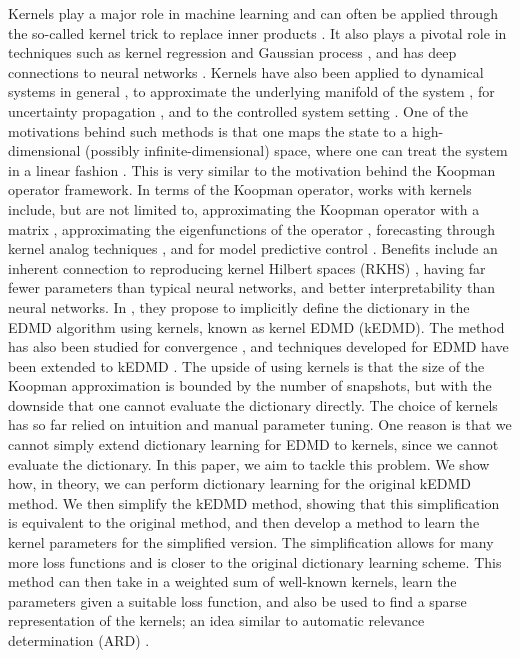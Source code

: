 \documentclass{article}
\begin{document}
Kernels play a major role in machine learning and can often be applied through the so-called kernel trick to replace inner products \citep{hastie-2009, owhadi-2019,hamzi-2024}. It also plays a pivotal role in techniques such as kernel regression and Gaussian process \citep{rasmussen-2005,yang-2021c, lee-2025b}, and has deep connections to neural networks \citep{jacot-2018,lee-2018, avidan-2024}. Kernels have also been applied to dynamical systems in general \citep{bouvrie-2017, hamzi-2021}, to approximate the underlying manifold of the system 
\citep{haasdonk-2018,bitteracher-2019, haasdonk-2021}, for uncertainty propagation \citep{hou-2024}, and to the controlled system setting \citep{hamzi-2019}. One of the motivations behind such methods is that one maps the state to a high-dimensional (possibly infinite-dimensional) space, where one can treat the system in a linear fashion \citep{bouvrie-2010, bouvrie-2012}. This is very similar to the motivation behind the Koopman operator framework. In terms of the Koopman operator, works with kernels include, but are not limited to, approximating the Koopman operator with a matrix \citep{williams-2015b, klus-2020}, approximating the eigenfunctions of the operator \citep{lee-2025}, forecasting through kernel analog techniques \citep{alexander-2020}, and for model predictive control \citep{bold-2025}. Benefits include an inherent connection to reproducing kernel Hilbert spaces (RKHS) \citep{boulle-2025}, having far fewer parameters than typical neural networks, and better interpretability than neural networks. In \citet{williams-2015b}, they propose to implicitly define the dictionary in the EDMD algorithm using kernels, known as kernel EDMD (kEDMD). The method has also been studied for convergence \citep{philipp-2025}, and techniques developed for EDMD have been extended to kEDMD \citep{colbrook-2021}. The upside of using kernels is that the size of the Koopman approximation is bounded by the number of snapshots, but with the downside that one cannot evaluate the dictionary directly. The choice of kernels has so far relied on intuition and manual parameter tuning. One reason is that we cannot simply extend dictionary learning for EDMD to kernels, since we cannot evaluate the dictionary. In this paper, we aim to tackle this problem. We show how, in theory, we can perform dictionary learning for the original kEDMD method. We then simplify the kEDMD method, showing that this simplification is equivalent to the original method, and then develop a method to learn the kernel parameters for the simplified version. The simplification allows for many more loss functions and is closer to the original dictionary learning scheme. This method can then take in a weighted sum of well-known kernels, learn the parameters given a suitable loss function, and also be used to find a sparse representation of the kernels; an idea similar to automatic relevance determination (ARD) \citep{williams-1995, mackay-1996}.
\end{document}

